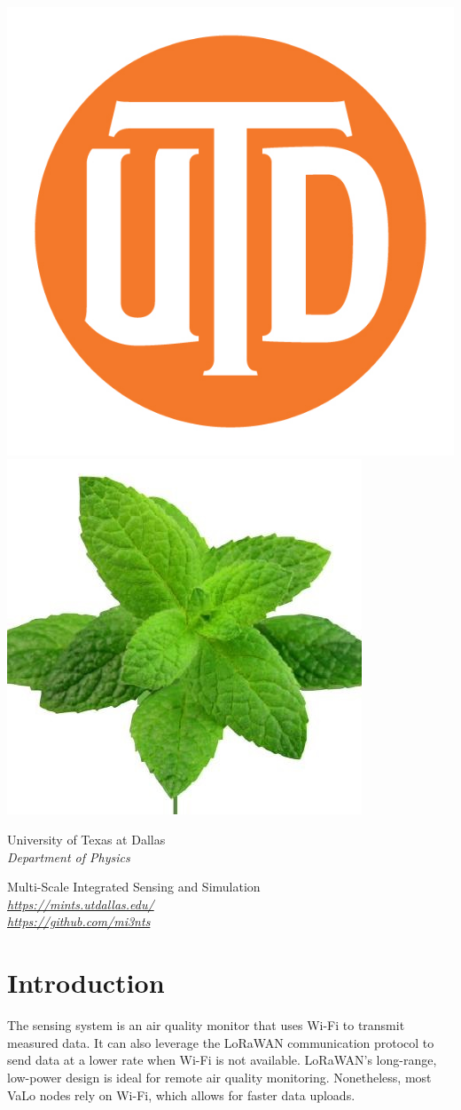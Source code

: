 \documentclass[12pt]{article}
\begin{document}
\begin{titlepage}
\begin{flushright}
\includegraphics[width=0.18\linewidth]{figures/monogram solid-rgb.jpg}
\includegraphics[width=0.18\linewidth]{figures/mi3nts.jpg}\\ 
\vfill

\footnotesize University of Texas at Dallas\\ 
\textit{Department of Physics}\\
\vspace{10pt}

Multi-Scale Integrated Sensing and Simulation\\ 
\textit{\url{https://mints.utdallas.edu/}}\\
\textit{\url{https://github.com/mi3nts}} \\

\end{flushright}
\end{titlepage}

\begin{center}
	\tableofcontents
	\listoftables
\end{center}
\pagebreak

\section{Introduction}
\label{sec:intro}

The sensing system is an air quality monitor that uses Wi-Fi to transmit measured data. It can also leverage the LoRaWAN communication protocol to send data at a lower rate when Wi-Fi is not available. LoRaWAN’s long-range, low-power design is ideal for remote air quality monitoring. Nonetheless, most VaLo nodes rely on Wi-Fi, which allows for faster data uploads.
\end{document}
